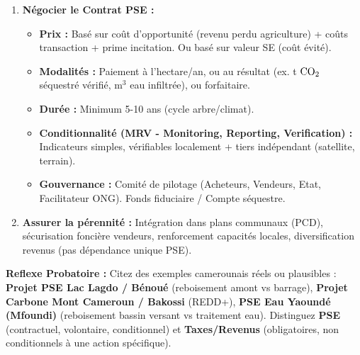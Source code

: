 \documentclass[11pt]{article}
\begin{document}
\begin{methode}
\begin{enumerate}
        \item \textbf{Négocier le Contrat PSE :}
        \begin{itemize}
            \item \textbf{Prix :} Basé sur coût d'opportunité (revenu perdu agriculture) + coûts transaction + prime incitation. Ou basé sur valeur SE (coût évité).
            \item \textbf{Modalités :} Paiement à l'hectare/an, ou au résultat (ex. t $\ce{CO2}$ séquestré vérifié, m$^3$ eau infiltrée), ou forfaitaire.
            \item \textbf{Durée :} Minimum 5-10 ans (cycle arbre/climat).
            \item \textbf{Conditionnalité (MRV - Monitoring, Reporting, Verification) :} Indicateurs simples, vérifiables localement + tiers indépendant (satellite, terrain).
            \item \textbf{Gouvernance :} Comité de pilotage (Acheteurs, Vendeurs, Etat, Facilitateur ONG). Fonds fiduciaire / Compte séquestre.
        \end{itemize}
        \item \textbf{Assurer la pérennité :} Intégration dans plans communaux (PCD), sécurisation foncière vendeurs, renforcement capacités locales, diversification revenus (pas dépendance unique PSE).
    \end{enumerate}
    \textbf{Reflexe Probatoire :} Citez des exemples camerounais réels ou plausibles : \textbf{Projet PSE Lac Lagdo / Bénoué} (reboisement amont vs barrage), \textbf{Projet Carbone Mont Cameroun / Bakossi} (REDD+), \textbf{PSE Eau Yaoundé (Mfoundi)} (reboisement bassin versant vs traitement eau). Distinguez \textbf{PSE} (contractuel, volontaire, conditionnel) et \textbf{Taxes/Revenus} (obligatoires, non conditionnels à une action spécifique).
\end{methode}
\end{document}
